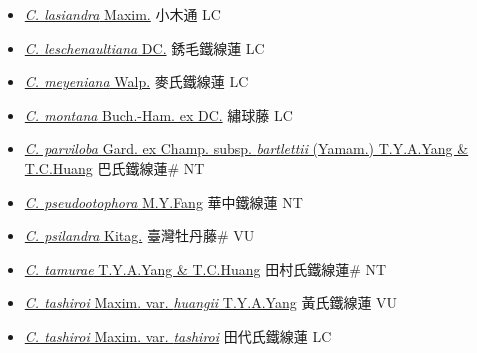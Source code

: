\begin{itemize}
\begin{itemize}
        \item[] \href{http://www.theplantlist.org/tpl1.1/search?q=Clematis+lasiandra}{\textit{C. lasiandra} Maxim.}   小木通 LC
        \item[] \href{http://www.theplantlist.org/tpl1.1/search?q=Clematis+leschenaultiana}{\textit{C. leschenaultiana} DC.}   銹毛鐵線蓮 LC
        \item[] \href{http://www.theplantlist.org/tpl1.1/search?q=Clematis+meyeniana}{\textit{C. meyeniana} Walp.}   麥氏鐵線蓮 LC
        \item[] \href{http://www.theplantlist.org/tpl1.1/search?q=Clematis+montana}{\textit{C. montana} Buch.-Ham. ex DC.}   繡球藤 LC
        \item[] \href{http://www.theplantlist.org/tpl1.1/search?q=Clematis+parviloba+subsp.+bartlettii}{\textit{C. parviloba} Gard. ex Champ. subsp. \textit{bartlettii} (Yamam.) T.Y.A.Yang \& T.C.Huang}   巴氏鐵線蓮\# NT
        \item[] \href{http://www.theplantlist.org/tpl1.1/search?q=Clematis+pseudootophora}{\textit{C. pseudootophora} M.Y.Fang}   華中鐵線蓮 NT
        \item[] \href{http://www.theplantlist.org/tpl1.1/search?q=Clematis+psilandra}{\textit{C. psilandra} Kitag.}   臺灣牡丹藤\# VU
        \item[] \href{http://www.theplantlist.org/tpl1.1/search?q=Clematis+tamurae}{\textit{C. tamurae} T.Y.A.Yang \& T.C.Huang}   田村氏鐵線蓮\# NT
        \item[] \href{http://www.theplantlist.org/tpl1.1/search?q=Clematis+tashiroi+var.+huangii}{\textit{C. tashiroi} Maxim. var. \textit{huangii} T.Y.A.Yang}   黃氏鐵線蓮 VU
        \item[] \href{http://www.theplantlist.org/tpl1.1/search?q=Clematis+tashiroi+var.+tashiroi}{\textit{C. tashiroi} Maxim. var. \textit{tashiroi}}   田代氏鐵線蓮 LC

\end{itemize}
\end{itemize}
